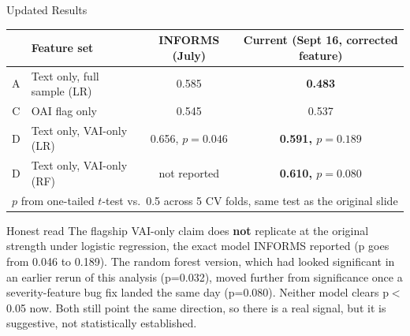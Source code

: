 \documentclass[aspectratio=169,10pt]{beamer}
\newcommand{\highlight}[1]{{\color{ncsuRed}\textbf{#1}}}
\begin{document}
\begin{frame}{Updated Results}
{\small
\begin{tabular}{clcc}
\toprule
 & Feature set & INFORMS (July) & Current (Sept 16, corrected feature) \\
\midrule
A & Text only, full sample (LR) & 0.585 & \highlight{0.483} \\
C & OAI flag only & 0.545 & 0.537 \\
\midrule
\pause
D & Text only, VAI-only (LR) & 0.656, $p{=}0.046$ & \highlight{0.591, $p{=}0.189$} \\
D & Text only, VAI-only (RF) & not reported & \highlight{0.610, $p{=}0.080$} \\
\bottomrule
\multicolumn{4}{l}{\scriptsize $p$ from one-tailed $t$-test vs.\ 0.5 across 5 CV folds, same test as the original slide}
\end{tabular}
}
\vspace{10pt}
\pause
\begin{alertblock}{Honest read}
\small The flagship VAI-only claim does \textbf{not} replicate at the original strength under
logistic regression, the exact model INFORMS reported (p goes from 0.046 to 0.189). The random
forest version, which had looked significant in an earlier rerun of this analysis (p=0.032),
moved further from significance once a severity-feature bug fix landed the same day (p=0.080).
Neither model clears p$<$0.05 now. Both still point the same direction, so there is a real signal,
but it is suggestive, not statistically established.
\end{alertblock}
\end{frame}
\end{document}
